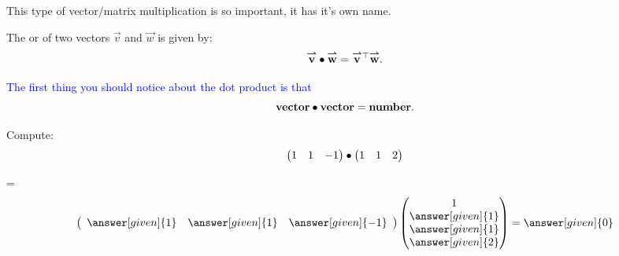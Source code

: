 \documentclass{ximera}
\begin{document}
This type of vector/matrix multiplication is so important, it has it's own name.

\begin{definition}
  The  or  of two vectors
  $\vec{v}$ and $\vec{w}$ is given by:
  \[
  {\overset{\boldsymbol{\rightharpoonup}}{\mathbf{v}}}\hspace{0in}\bullet {\overset{\boldsymbol{\rightharpoonup}}{\mathbf{w}}}\hspace{0in} =  {\overset{\boldsymbol{\rightharpoonup}}{\mathbf{v}}}\hspace{0in}^\top {\overset{\boldsymbol{\rightharpoonup}}{\mathbf{w}}}\hspace{0in}.
  \]
\end{definition}

\textcolor{blue}{The first thing you should notice about the dot product is that
\[
\mathbf{vector}\bullet \mathbf{vector} = \mathbf{number}.
\]}


\begin{question}
  Compute:
  \[
  \begin{pmatrix} 1 & 1 & -1 \end{pmatrix}
  \bullet\begin{pmatrix} 1 & 1 & 2\end{pmatrix}\]
  \begin{prompt}
    = \textcolor{blue}{\[\left(\begin{array}{ccc} \answer[given]{1} & \answer[given]{1} & \answer[given]{-1}\end{array}\right) \begin{pmatrix} 1\\
    \answer[given]{1}\\
    \answer[given]{1}\\
    \answer[given]{2}
    \end{pmatrix}= \answer[given]{0}
    \]}
  \end{prompt}
\end{question}
\end{document}
